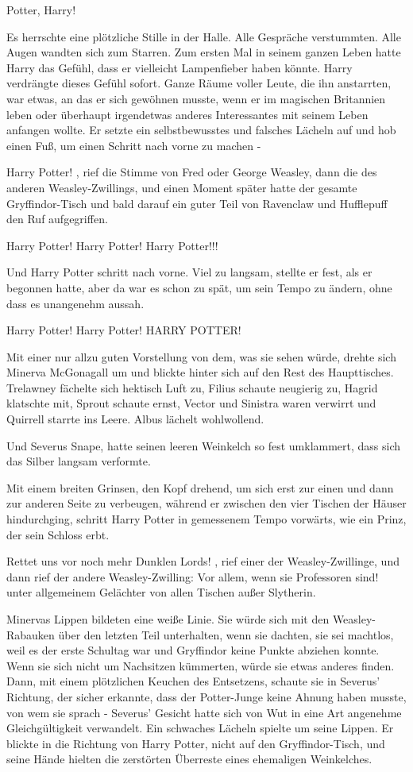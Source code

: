 \glqq Potter, Harry!\grqq{}

Es herrschte eine plötzliche Stille in der Halle. Alle Gespräche verstummten.
Alle Augen wandten sich zum Starren. Zum ersten Mal in seinem ganzen Leben hatte
Harry das Gefühl, dass er vielleicht Lampenfieber haben könnte. Harry verdrängte
dieses Gefühl sofort. Ganze Räume voller Leute, die ihn anstarrten, war etwas,
an das er sich gewöhnen musste, wenn er im magischen Britannien leben oder
überhaupt irgendetwas anderes Interessantes mit seinem Leben anfangen wollte. Er
setzte ein selbstbewusstes und falsches Lächeln auf und hob einen Fuß, um einen
Schritt nach vorne zu machen -

\glqq Harry Potter!\grqq{} , rief die Stimme von Fred oder George Weasley, dann
die des anderen Weasley-Zwillings, und einen Moment später hatte der gesamte
Gryffindor-Tisch und bald darauf ein guter Teil von Ravenclaw und Hufflepuff den
Ruf aufgegriffen.

\glqq Harry Potter! Harry Potter! Harry Potter!!!\grqq{}

Und Harry Potter schritt nach vorne. Viel zu langsam, stellte er fest, als er
begonnen hatte, aber da war es schon zu spät, um sein Tempo zu ändern, ohne dass
es unangenehm aussah.

\glqq Harry Potter! Harry Potter! HARRY POTTER!\grqq{}

Mit einer nur allzu guten Vorstellung von dem, was sie sehen würde, drehte sich
Minerva McGonagall um und blickte hinter sich auf den Rest des Haupttisches.
Trelawney fächelte sich hektisch Luft zu, Filius schaute neugierig zu, Hagrid
klatschte mit, Sprout schaute ernst, Vector und Sinistra waren verwirrt und
Quirrell starrte ins Leere. Albus lächelt wohlwollend.

Und Severus Snape, hatte seinen leeren Weinkelch so fest umklammert, dass sich
das Silber langsam verformte.

Mit einem breiten Grinsen, den Kopf drehend, um sich erst zur einen und dann zur
anderen Seite zu verbeugen, während er zwischen den vier Tischen der Häuser
hindurchging, schritt Harry Potter in gemessenem Tempo vorwärts, wie ein Prinz,
der sein Schloss erbt.

\glqq Rettet uns vor noch mehr Dunklen Lords!\grqq{} , rief einer der
Weasley-Zwillinge, und dann rief der andere Weasley-Zwilling: \glqq Vor allem,
wenn sie Professoren sind!\grqq{} unter allgemeinem Gelächter von allen Tischen
außer Slytherin.

Minervas Lippen bildeten eine weiße Linie. Sie würde sich mit den
Weasley-Rabauken über den letzten Teil unterhalten, wenn sie dachten, sie sei
machtlos, weil es der erste Schultag war und Gryffindor keine Punkte abziehen
konnte. Wenn sie sich nicht um Nachsitzen kümmerten, würde sie etwas anderes
finden. Dann, mit einem plötzlichen Keuchen des Entsetzens, schaute sie in
Severus' Richtung, der sicher erkannte, dass der Potter-Junge keine Ahnung haben
musste, von wem sie sprach - Severus' Gesicht hatte sich von Wut in eine Art
angenehme Gleichgültigkeit verwandelt. Ein schwaches Lächeln spielte um seine
Lippen. Er blickte in die Richtung von Harry Potter, nicht auf den
Gryffindor-Tisch, und seine Hände hielten die zerstörten Überreste eines
ehemaligen Weinkelches.

